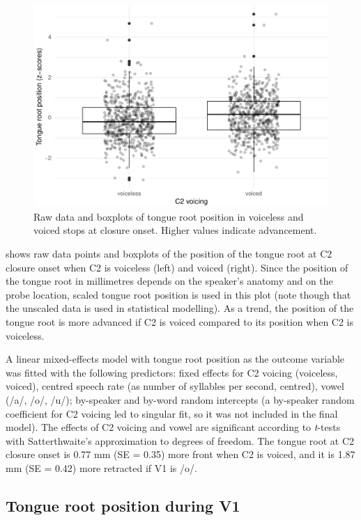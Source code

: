 \documentclass[12pt,]{article}
\begin{document}
\begin{figure}
\includegraphics[width=\linewidth]{2018-tra_files/figure-latex/trp-z-box-1} \caption{Raw data and boxplots of tongue root position in voiceless and voiced stops at closure onset. Higher values indicate advancement.}\label{f:trp-z-box}
\end{figure}

 shows raw data points and boxplots of the position of
the tongue root at C2 closure onset when C2 is voiceless (left) and
voiced (right). Since the position of the tongue root in millimetres
depends on the speaker's anatomy and on the probe location, scaled
tongue root position is used in this plot (note though that the unscaled
data is used in statistical modelling). As a trend, the position of the
tongue root is more advanced if C2 is voiced compared to its position
when C2 is voiceless.

A linear mixed-effects model with tongue root position as the outcome
variable was fitted with the following predictors: fixed effects for C2
voicing (voiceless, voiced), centred speech rate (as number of syllables
per second, centred), vowel (/a/, /o/, /u/); by-speaker and by-word
random intercepts (a by-speaker random coefficient for C2 voicing led to
singular fit, so it was not included in the final model). The effects of
C2 voicing and vowel are significant according to \emph{t}-tests with
Satterthwaite's approximation to degrees of freedom. The tongue root at
C2 closure onset is 0.77 mm (SE = 0.35) more front when C2 is voiced,
and it is 1.87 mm (SE = 0.42) more retracted if V1 is /o/.

\hypertarget{tongue-root-position-during-v1}{%
\subsection{Tongue root position during
V1}\label{tongue-root-position-during-v1}}
\end{document}
